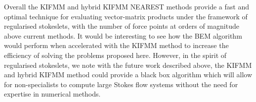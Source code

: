 Overall the KIFMM and hybrid KIFMM NEAREST methods provide a fast and optimal technique for evaluating vector-matrix products under the framework of regularised stokeslets, with the number of force points at orders of magnitude above current methods. It would be interesting to see how the BEM algorithm would perform when accelerated with the KIFMM method \cite{Cao2012ABEM,Cao2015AAnalysis,Betcke2021Bempp-cl:Library.} to increase the efficiency of solving the problems proposed here. However, in the spirit of regularised stokeslets, we note with the future work described above, the KIFMM and hybrid KIFMM method could provide a black box algorithm which will allow for non-specialists to compute large Stokes flow systems without the need for expertise in numerical methods.